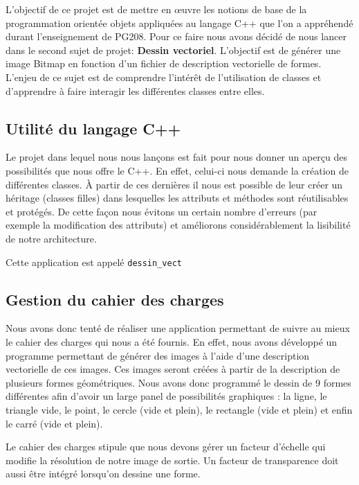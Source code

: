 \documentclass[11pt]{article}
\begin{document}
L'objectif de ce projet est de mettre en œuvre les notions de base de la programmation orientée objets appliquées au langage C++ que l'on a appréhendé durant l’enseignement de PG208. Pour ce faire nous avons décidé de nous lancer dans le second sujet de projet: \textbf{Dessin vectoriel}. L'objectif est de générer une image Bitmap en fonction d'un fichier de description vectorielle de formes. L'enjeu de ce sujet est de comprendre l’intérêt de l'utilisation de classes et d'apprendre à faire interagir les différentes classes entre elles. \\

\subsection{Utilité du langage C++}

Le projet dans lequel nous nous lançons est fait pour nous donner un aperçu des possibilités que nous offre le C++. En effet, celui-ci nous demande la création de différentes classes. À partir de ces dernières il nous est possible de leur créer un héritage (classes filles) dans lesquelles les attributs et méthodes sont réutilisables et protégés. De cette façon nous évitons un certain nombre d’erreurs (par exemple la modification des attributs) et améliorons considérablement la lisibilité de notre architecture. 

Cette application est appelé \texttt{dessin\_vect}

\subsection{Gestion du cahier des charges}

Nous avons donc tenté de réaliser une application permettant de suivre au mieux le cahier des charges qui nous a été fournis. En effet, nous avons développé un programme permettant de générer des images à l’aide d’une description vectorielle de ces images. Ces images seront créées à partir de la description de plusieurs formes géométriques. Nous avons donc programmé le dessin de 9 formes différentes afin d'avoir un large panel de possibilités graphiques : la ligne, le triangle vide, le point, le cercle (vide et plein), le rectangle (vide et plein) et enfin le carré (vide et plein). 

Le cahier des charges stipule que nous devons gérer un facteur d'échelle qui modifie la résolution de notre image de sortie. Un facteur de transparence doit aussi être intégré lorsqu'on dessine une forme. 
\end{document}
